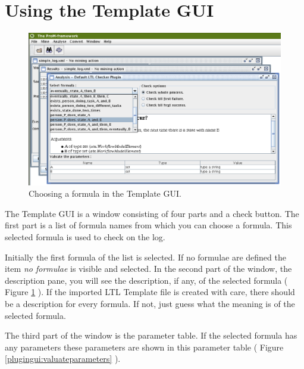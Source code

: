 \section{Using the Template GUI}
\label{plugingui:templategui}

\begin{figure}[H]
    \includegraphics[scale=0.4]{images/ltlchecker-choose-formula-cutted.eps}
    \caption{Choosing a formula in the Template GUI.}
    \label{plugingui:chooseformula}
\end{figure}

The Template GUI is a window consisting of four parts and a check button. The
first part is a list of formula names from which you can choose a formula.
This selected formula is used to check on the log. 

Initially the first formula of the list is selected. If no formulae are
defined the item \textit{no formulae} is visible and selected. In the second
part of the window, the description pane, you will see the description, if
any, of the selected formula ( Figure \ref{plugingui:chooseformula} ).
If the imported LTL Template file is created with care, there should be a
description for every formula. If not, just guess what the meaning is of the
selected formula. 

The third part of the window is the parameter table. If the selected formula
has any parameters these parameters are shown in this parameter table ( Figure
\ref{plugingui:valuateparameters} ).

